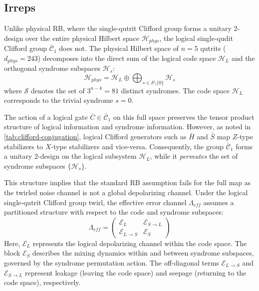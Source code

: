 \subsection{Irreps}
Unlike physical RB, where the single-qutrit Clifford group forms a unitary 2-design over the entire physical Hilbert space $\mathcal{H}_{phys}$, the logical single-qudit Clifford group $\bar{\mathcal{C}}_1$ does not. The physical Hilbert space of $n=5$ qutrits ($d_{phys} = 243$) decomposes into the direct sum of the logical code space $\mathcal{H}_L$ and the orthogonal syndrome subspaces $\mathcal{H}_{s}$:
\begin{equation}
    \mathcal{H}_{phys} = \mathcal{H}_L \oplus \bigoplus_{s \in \mathcal{S} \setminus \{0\}} \mathcal{H}_{s}
\end{equation}
where $\mathcal{S}$ denotes the set of $3^{n-k} = 81$ distinct syndromes. The code space $\mathcal{H}_L$ corresponds to the trivial syndrome $s=0$.

The action of a logical gate $\bar{C} \in \bar{\mathcal{C}}_1$ on this full space preserves the tensor product structure of logical information and syndrome information. However, as noted in \autoref{tab:clifford-conjugation}, logical Clifford generators such as $\bar{H}$ and $\bar{S}$ map $Z$-type stabilizers to $X$-type stabilizers and vice-versa. Consequently, the group $\bar{\mathcal{C}}_1$ forms a unitary 2-design on the logical subsystem $\mathcal{H}_L$, while it \emph{permutes} the set of syndrome subspaces $\{\mathcal{H}_s\}$.

This structure implies that the standard RB assumption fails for the full map as the twirled noise channel is not a global depolarizing channel. Under the logical single-qutrit Clifford group twirl, the effective error channel $\Lambda_{eff}$ assumes a partitioned structure with respect to the code and syndrome subspaces:
\begin{equation}
    \Lambda_{eff} = \begin{pmatrix} 
    \mathcal{E}_{L} & \mathcal{E}_{S \to L} \\
    \mathcal{E}_{L \to S} & \mathcal{E}_{S} 
    \end{pmatrix}
\end{equation}
Here, $\mathcal{E}_{L}$ represents the logical depolarizing channel within the code space. The block $\mathcal{E}_{S}$ describes the mixing dynamics within and between syndrome subspaces, governed by the syndrome permutation action. The off-diagonal terms $\mathcal{E}_{L \to S}$ and $\mathcal{E}_{S \to L}$ represent leakage (leaving the code space) and seepage (returning to the code space), respectively.

